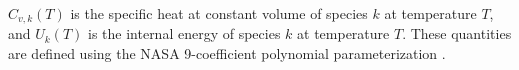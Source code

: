 $C_{v,k}(T)$ is the specific heat at constant volume of species $k$ at temperature $T$, and $U_{k}(T)$ is
the internal energy of species $k$ at temperature $T$. These quantities are defined using the NASA 9-coefficient
polynomial parameterization \cite{mcbride2002nasa}.




